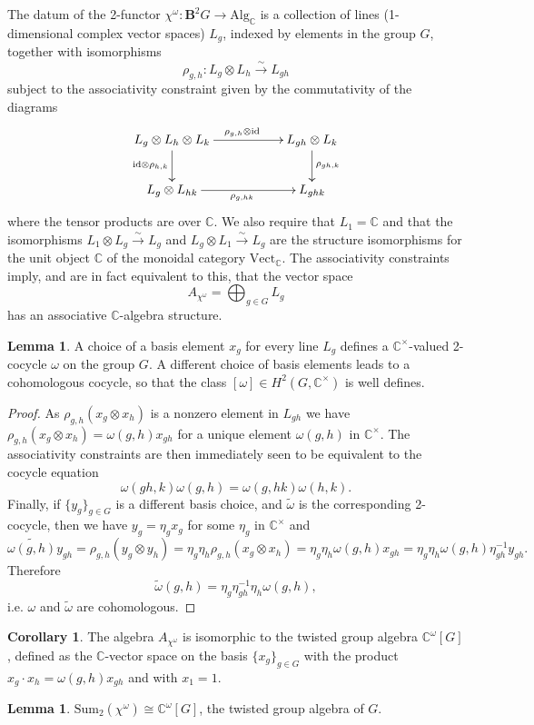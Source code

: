 \documentclass[12pt]{scrartcl}
\newcommand{\boldB}{\boldsymbol{B}}
\newcommand{\C}{\mathds{C}}
\theoremstyle{definition}
\newtheorem{lemma}[definition]{Lemma}
\newtheorem{corollary}[definition]{Corollary}
\numberwithin{equation}{section}
\numberwithin{definition}{section}
\numberwithin{figure}{section}
\begin{document}
The datum of the 2-functor $\chi^\omega \colon \boldB^2 G \to \text{Alg}_\C$ is a collection of lines (1-dimensional complex vector spaces) $L_g$, indexed by elements in the group $G$, together with isomorphisms
\[
\rho_{g,h}\colon L_g\otimes L_h\xrightarrow{\sim} L_{gh}
\]
subject to the associativity constraint given by the commutativity of the diagrams
\[
\xymatrix{
L_g\otimes L_h\otimes L_k\ar[rr]^{\rho_{g,h}\otimes \mathrm{id}}\ar[d]_{\mathrm{id}\otimes \rho_{h,k}}&& L_{gh}\otimes L_k\ar[d]^{\rho_{gh,k}}\\
L_g\otimes L_{hk}\ar[rr]_{\rho_{g,hk}} &&L_{ghk}
}
\]
where the tensor products are over $\C$. We also require that $L_1=\C$ and that the isomorphisms $L_1\otimes L_g\xrightarrow{\sim}L_g$ and $L_g\otimes L_1\xrightarrow{\sim}L_g$ are the structure isomorphisms for the unit object $\C$ of the monoidal category $\mathrm{Vect}_\C$.
The associativity constraints imply, and are in fact equivalent to this, that the vector space
\[
A_{\chi^\omega}=\bigoplus_{g\in G} L_g
\]
has an associative $\C$-algebra structure.
\begin{lemma}
A choice of a basis element $x_g$ for every line $L_g$ defines a $\C^\times$-valued 2-cocycle $\omega$ on the group $G$. A different choice of basis elements leads to a cohomologous cocycle, so that the class $[\omega]\in H^2(G,\C^\times)$ is well defines.
\end{lemma}
\begin{proof}
As $\rho_{g,h}(x_g\otimes x_h)$ is a nonzero element in $L_{gh}$ we have $\rho_{g,h}(x_g\otimes x_h)=\omega(g,h)x_{gh}$ for a unique element $\omega(g,h)$ in $\C^\times$. The associativity constraints are then immediately seen to be equivalent to the cocycle equation
\[
\omega(gh,k)\omega(g,h)=\omega(g,hk)\omega(h,k).
\]
Finally, if $\{y_g\}_{g\in G}$ is a different basis choice, and $\tilde{\omega}$ is the corresponding 2-cocycle, then we have $y_g=\eta_gx_g$ for some $\eta_g$ in $\C^\times$ and
\[
\tilde{\omega(g,h)}y_{gh}=\rho_{g,h}(y_g\otimes y_h)=\eta_g\eta_h\rho_{g,h}(x_g\otimes x_h)=\eta_g\eta_h\omega(g,h)x_{gh}=\eta_g\eta_h\omega(g,h)\eta_{gh}^{-1}y_{gh}.
\]
Therefore
\[
\tilde{\omega}(g,h)=\eta_g\eta_{gh}^{-1}\eta_h\omega(g,h),
\]
i.e. $\omega$ and $\tilde{\omega}$ are cohomologous.
\end{proof}
\begin{corollary}
The algebra $A_{\chi^\omega}$ is isomorphic to the twisted group algebra $\C^\omega[G]$, defined as the $\C$-vector space on the basis $\{x_g\}_{g\in G}$ with the product $x_g\cdot x_h=\omega(g,h)x_{gh}$ and with $x_1=1$.
\end{corollary}
\begin{lemma}\label{lemma:cocone-is-coinvariants}
$\text{Sum}_2(\chi^\omega) \cong \C^\omega[G]$, the  twisted group algebra of $G$.
\end{lemma}
\end{document}
